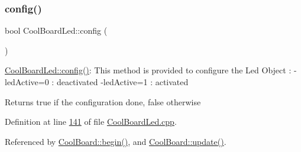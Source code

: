 \subsubsection{\texorpdfstring{config()}{config()}}
{\footnotesize\ttfamily bool Cool\+Board\+Led\+::config (\begin{DoxyParamCaption}{ }\end{DoxyParamCaption})}

\hyperlink{class_cool_board_led_a1b60e5e30bea96c49ed62ed1bf1ffc8b}{Cool\+Board\+Led\+::config()}\+: This method is provided to configure the Led Object \+: -\/led\+Active=0 \+: deactivated -\/led\+Active=1 \+: activated \begin{DoxyReturn}{Returns}
true if the configuration done, false otherwise 
\end{DoxyReturn}


Definition at line \hyperlink{_cool_board_led_8cpp_source_l00141}{141} of file \hyperlink{_cool_board_led_8cpp_source}{Cool\+Board\+Led.\+cpp}.



Referenced by \hyperlink{_cool_board_8cpp_source_l00021}{Cool\+Board\+::begin()}, and \hyperlink{_cool_board_8cpp_source_l00411}{Cool\+Board\+::update()}.


